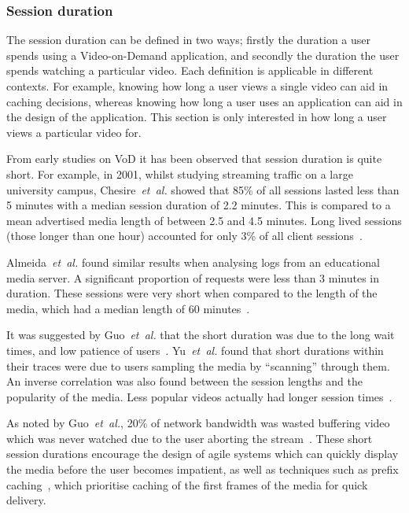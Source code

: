 
\subsubsection{Session duration}

    The session duration can be defined in two ways; firstly the duration a user spends using a Video-on-Demand application, and secondly the duration the user spends watching a particular video. Each definition is applicable in different contexts. For example, knowing how long a user views a single video can aid in caching decisions, whereas knowing how long a user uses an application can aid in the design of the application. This section is only interested in how long a user views a particular video for.

    From early studies on VoD it has been observed that session duration is quite short. For example, in 2001, whilst studying streaming traffic on a large university campus, Chesire~\emph{et~al.} showed that 85\% of all sessions lasted less than 5 minutes with a median session duration of 2.2 minutes. This is compared to a mean advertised media length of between 2.5 and 4.5 minutes. Long lived sessions (those longer than one hour) accounted for only 3\% of all client sessions~\cite{chesire2001maa}.

    Almeida~\emph{et~al.} found similar results when analysing logs from an educational media server. A significant proportion of requests were less than 3 minutes in duration. These sessions were very short when compared to the length of the media, which had a median length of 60 minutes~\cite{almeida2001aem}.


    It was suggested by Guo~\emph{et~al.} that the short duration was due to the long wait times, and low patience of users~\cite{guo2005amw}. Yu~\emph{et~al.} found that short durations within their traces were due to users sampling the media by ``scanning'' through them. An inverse correlation was also found between the session lengths and the popularity of the media. Less popular videos actually had longer session times~\cite{yu2006uub}.

    As noted by Guo~\emph{et~al.}, 20\% of network bandwidth was wasted buffering video which was never watched due to the user aborting the stream~\cite{guo2005amw}. These short session durations encourage the design of agile systems which can quickly display the media before the user becomes impatient, as well as techniques such as prefix caching~\cite{sen99ppc}, which prioritise caching of the first frames of the media for quick delivery.

